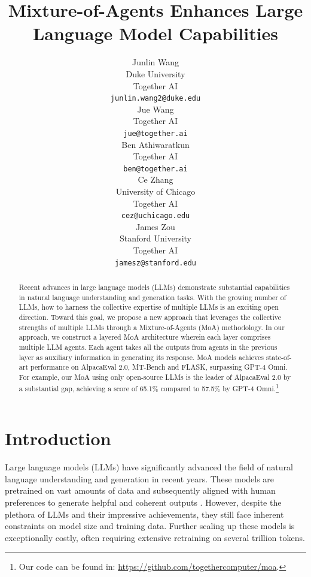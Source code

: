 \documentclass{article}
\title{Mixture-of-Agents Enhances Large Language Model Capabilities}
\author{%
  Junlin Wang \\
  Duke University \\
  Together AI \\
  \texttt{junlin.wang2@duke.edu} \\
  \And
  Jue Wang \\
  Together AI \\
  \texttt{jue@together.ai} \\
  \And
  Ben Athiwaratkun \\
  Together AI \\
  \texttt{ben@together.ai} \\
  \And
  Ce Zhang \\
  University of Chicago \\
  Together AI \\
  \texttt{cez@uchicago.edu} \\
  \And
  James Zou \\
  Stanford University \\
  Together AI\\
  \texttt{jamesz@stanford.edu} \\
}
\begin{document}
\maketitle

\begin{abstract}

Recent advances in large language models (LLMs) demonstrate substantial capabilities in natural language understanding and generation tasks. 
With the growing number of LLMs, how to harness the collective expertise of multiple LLMs is an exciting open direction.
Toward this goal, we propose a new approach that leverages the collective strengths of multiple LLMs through a Mixture-of-Agents (MoA) methodology.
In our approach, we construct a layered MoA architecture wherein each layer comprises multiple LLM agents.
Each agent takes all the outputs from agents in the previous layer as auxiliary information in generating its response.   
MoA models achieves state-of-art performance on  AlpacaEval 2.0, MT-Bench and FLASK, surpassing GPT-4 Omni. For example, our MoA using only open-source LLMs is the leader of AlpacaEval 2.0 by a substantial gap, achieving a score of 65.1\% compared to 57.5\% by GPT-4 Omni.\footnote{
Our code can be found in: \url{https://github.com/togethercomputer/moa}.
}

\end{abstract}

\section{Introduction}
\label{section:introduction}

Large language models (LLMs) \citep{opt,palm,llama,gemini,gpt3,gpt4}
have significantly advanced the field of natural language understanding and generation in recent years.
These models are pretrained on vast amounts of data and subsequently aligned with human preferences to generate helpful and coherent outputs \citep{rlhf}.
However, despite the plethora of LLMs and their impressive achievements, 
they still face inherent constraints on model size and training data.
Further scaling up these models is exceptionally costly, often requiring extensive retraining on several trillion tokens.
\end{document}
